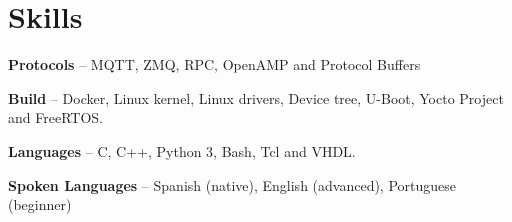 \section{Skills}
\begin{small}
	\parbox[t][][t]{\linewidth}{
		\textbf{Protocols} -- {MQTT, ZMQ, RPC, OpenAMP and Protocol Buffers}
		\bigbreak
	}
	\parbox[t][][t]{\linewidth}{
		\textbf{Build} -- {Docker, Linux kernel, Linux drivers, Device tree, U-Boot, Yocto Project and FreeRTOS.}
		\bigbreak
	}
	\parbox[t][][t]{\linewidth}{
		\textbf{Languages} -- {C, C++, Python 3, Bash, Tcl and VHDL.}
		\bigbreak
	}
	\parbox[t][][t]{\linewidth}{
		\textbf{Spoken Languages} -- {Spanish (native), English (advanced), Portuguese (beginner)}
		\bigbreak
	}
\end{small}
